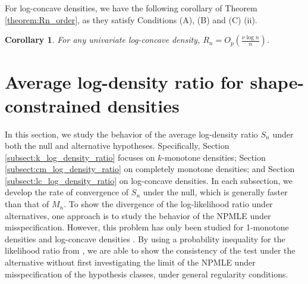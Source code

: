 \documentclass[12pt,letterpaper, twoside, openany]{article}
\theoremstyle{plain}
\newtheorem{corollary}[theorem]{Corollary}
\begin{document}
	
 For log-concave densities, we have the following corollary of Theorem \ref{theorem:Rn_order}, as they satisfy	Conditions (A), (B) and (C) (ii).
	\begin{corollary}\label{col:lcb1b2}
 For any univariate log-concave density, $R_n = O_p\left( \frac{\nu \log n}{n}\right)$.
	\end{corollary}

 
\section{Average log-density ratio for shape-constrained densities}\label{sect:shape}
In this section, we study the behavior of the average log-density ratio $S_{n}$ under both the null and alternative hypotheses. Specifically, Section \ref{subsect:k_log_density_ratio} focuses on $k$-monotone densities; Section \ref{subsect:cm_log_density_ratio} on completely monotone densities; and Section \ref{subsect:lc_log_density_ratio} on log-concave densities. In each subsection, we develop the rate of convergence of $S_n$ under the null, which is generally faster than that of $M_n$. To show the divergence of the log-likelihood ratio under alternatives, one approach is to study the behavior of the NPMLE under misspecification.  However, this problem has only been studied for 1-monotone densities \citep{Patilea2001} and log-concave densities \citep{cule2010theoretical}. By using a probability inequality for the likelihood ratio from \cite{wong1995probability}, we are able to show the consistency of the test under the alternative without first investigating the limit of the NPMLE under misspecification of the hypothesis classes, under general regularity conditions.  
\end{document}
